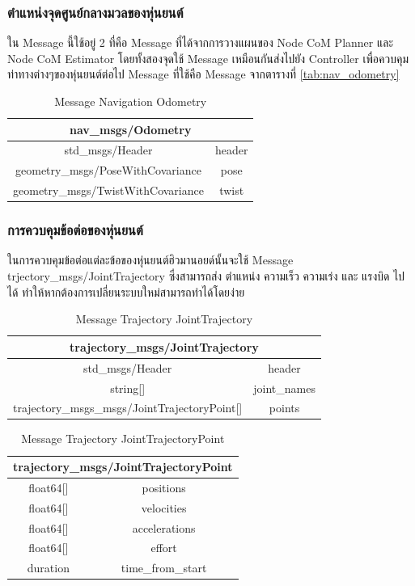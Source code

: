 \subsubsection*{ตำแหน่งจุดศูนย์กลางมวลของหุ่นยนต์}
ใน Message นี้ใช้อยู่ 2 ที่คือ Message ที่ได้จากการวางแผนของ Node CoM Planner และ Node CoM Estimator
โดยทั้งสองจุดใช้ Message เหมือนกันส่งไปยัง Controller เพื่อควบคุมท่าทางต่างๆของหุ่นยนต์ต่อไป
Message ที่ใช้คือ Message จากตารางที่ \ref{tab:nav_odometry}
\begin{table}[!ht]
	\centering
	\begin{tabular}{| c | c |}
		\hline
		\multicolumn{2}{|c|}{nav\_msgs/Odometry}\\
		\hline
		std\_msgs/Header & header \\
		geometry\_msgs/PoseWithCovariance & pose \\
		geometry\_msgs/TwistWithCovariance & twist \\
		\hline
	\end{tabular}
	\caption*{Message Navigation Odometry}
\end{table}

\clearpage
\subsubsection*{การควบคุมข้อต่อของหุ่นยนต์}
ในการควบคุมข้อต่อแต่ละข้อของหุ่นยนต์ฮิวมานอยด์นั้นจะใช้ Message trjectory\_msgs/JointTrajectory
ซึ่งสามารถส่ง ตำแหน่ง ความเร็ว ความเร่ง และ แรงบิด ไปได้ ทำให้หากต้องการเปลี่ยนระบบใหม่สามารถทำได้โดยง่าย

\begin{table}[!ht]
	\centering
	\begin{tabular}{| c | c |}
		\hline
		\multicolumn{2}{|c|}{trajectory\_msgs/JointTrajectory}\\
		\hline
		std\_msgs/Header & header \\
		string[] & joint\_names \\
		trajectory\_msgs\_msgs/JointTrajectoryPoint[] & points \\
		\hline
	\end{tabular}
	\caption{Message Trajectory JointTrajectory}
	\label{tab:trajectory_jointrajectory}
\end{table}
\begin{table}[!ht]
	\centering
	\begin{tabular}{| c | c |}
		\hline
		\multicolumn{2}{|c|}{trajectory\_msgs/JointTrajectoryPoint}\\
		\hline
		float64[] & positions \\
		float64[] & velocities \\
  		float64[] & accelerations \\
  		float64[] & effort \\
  		duration & time\_from\_start \\
		\hline
	\end{tabular}
	\caption{Message Trajectory JointTrajectoryPoint}
	\label{tab:trajectory_jointrajectorypoint}
\end{table}

